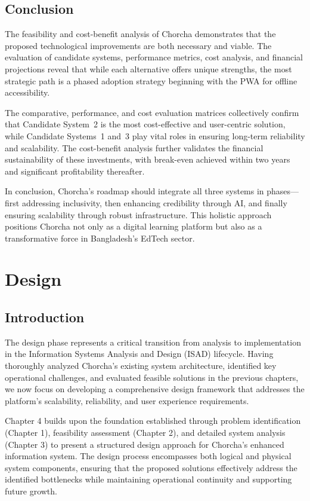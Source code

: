\documentclass[12pt,a4paper,oneside]{book}
\begin{document}
\section{Conclusion}

The feasibility and cost-benefit analysis of Chorcha demonstrates that the proposed technological improvements are both necessary and viable. The evaluation of candidate systems, performance metrics, cost analysis, and financial projections reveal that while each alternative offers unique strengths, the most strategic path is a phased adoption strategy beginning with the PWA for offline accessibility.

The comparative, performance, and cost evaluation matrices collectively confirm that Candidate System~2 is the most cost-effective and user-centric solution, while Candidate Systems~1 and~3 play vital roles in ensuring long-term reliability and scalability. The cost-benefit analysis further validates the financial sustainability of these investments, with break-even achieved within two years and significant profitability thereafter.

In conclusion, Chorcha’s roadmap should integrate all three systems in phases---first addressing inclusivity, then enhancing credibility through AI, and finally ensuring scalability through robust infrastructure. This holistic approach positions Chorcha not only as a digital learning platform but also as a transformative force in Bangladesh’s EdTech sector.


\newpage

\chapter{Design}

\section{Introduction}

The design phase represents a critical transition from analysis to implementation in the Information Systems Analysis and Design (ISAD) lifecycle. Having thoroughly analyzed Chorcha's existing system architecture, identified key operational challenges, and evaluated feasible solutions in the previous chapters, we now focus on developing a comprehensive design framework that addresses the platform's scalability, reliability, and user experience requirements.

Chapter 4 builds upon the foundation established through problem identification (Chapter 1), feasibility assessment (Chapter 2), and detailed system analysis (Chapter 3) to present a structured design approach for Chorcha's enhanced information system. The design process encompasses both logical and physical system components, ensuring that the proposed solutions effectively address the identified bottlenecks while maintaining operational continuity and supporting future growth.
\end{document}
